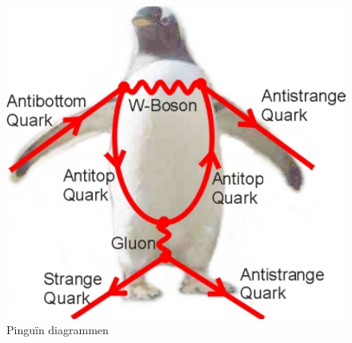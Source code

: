 \documentclass[../main.tex]{subfiles}
\begin{document}
\begin{figure}[h]
    \centering
    \includegraphics[width=0.8\linewidth]{physics_beyond_the_standard_model/pinguin_diagrammen.png}
    \caption{Pinguïn diagrammen}%
    \label{fig:physics_beyond_the_standard_model/pinguin_diagrammen}
\end{figure}
\end{document}
